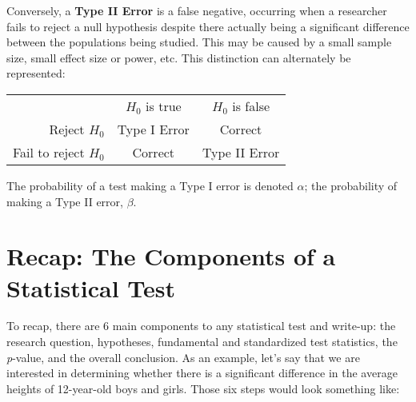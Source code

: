 Conversely, a \textbf{Type II Error}  is a false negative, occurring when a researcher fails to reject a null hypothesis despite there actually being a significant difference between the populations being studied. This may be caused by a small sample size, small effect size or power, etc. This distinction can alternately be represented:

\begin{center}
\begin{tabular}{|r c c|}
\hline
& $H_0$ is true & $H_0$ is false \\
 Reject $H_0$ & Type I Error & Correct\\
Fail to reject $H_0$ & Correct & Type II Error\\
\hline
\end{tabular}
\end{center}

The probability of a test making a Type I error is denoted $\alpha$; the probability of making a Type II error, $\beta$.

\section{Recap: The Components of a Statistical Test}

To recap, there are 6 main components to any statistical test and write-up: the research question, hypotheses, fundamental and standardized test statistics, the \textit{p}-value, and the overall conclusion. As an example, let's say that we are interested in determining whether there is a significant difference in the average heights of 12-year-old boys and girls. Those six steps would look something like:

